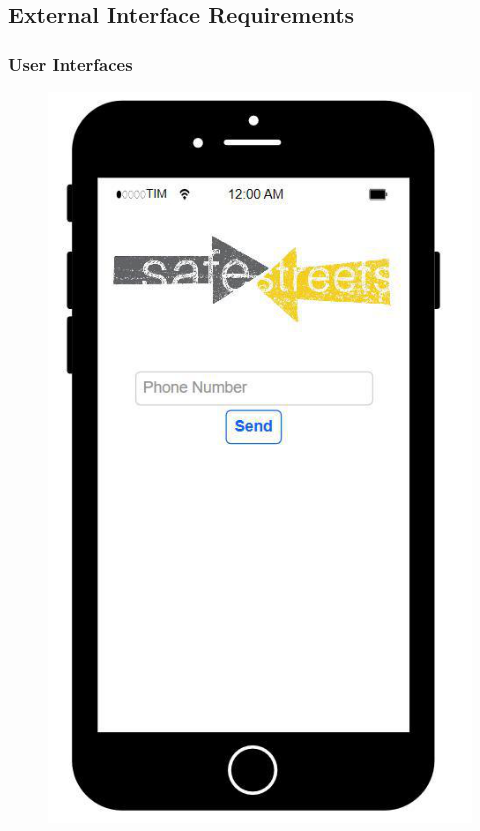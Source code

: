 \subsection{External Interface Requirements}

\subsubsection{User Interfaces}

\begin{figure} [H]
    \includegraphics[scale=0.52]{Images/Templates/User/us_0.png}

\end{figure}
